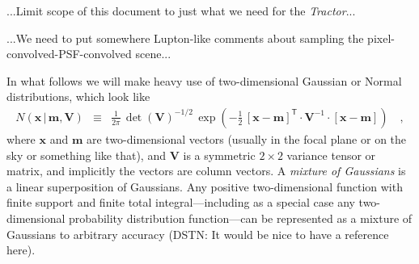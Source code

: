 \documentclass[12pt,pdftex,preprint]{aastex}
\newcommand{\project}[1]{\textsl{#1}}
\newcommand{\tractor}{\project{Tractor}}
\newcommand{\tmatrix}[1]{\boldsymbol{#1}}
\newcommand{\inverse}[1]{{#1}^{-1}}
\newcommand{\transpose}[1]{{#1}^{\mathsf T}}
\newcommand{\tvector}[1]{\boldsymbol{#1}}
\newcommand{\pos}{\tvector{x}}
\newcommand{\mean}{\tvector{m}}
\newcommand{\var}{\tmatrix{V}\!}
\newcommand{\normal}{N}
\newcommand{\given}{\,|\,}
\begin{document}
...Limit scope of this document to just what we need for the
\tractor...

...We need to put somewhere Lupton-like comments about sampling the
pixel-convolved-PSF-convolved scene...

In what follows we will make heavy use of two-dimensional Gaussian or
Normal distributions, which look like
\begin{eqnarray}\displaystyle
\normal(\pos\given\mean,\var) &\equiv& \frac{1}{2\pi}\,\det(\var)^{-1/2}\,\exp(-\frac{1}{2}\,\transpose{[\pos-\mean]}\cdot\inverse{\var}\cdot[\pos-\mean])
\quad ,
\end{eqnarray}
where $\pos$ and $\mean$ are two-dimensional vectors (usually in the
focal plane or on the sky or something like that), and $\var$ is a
symmetric $2\times 2$ variance tensor or matrix, and implicitly the
vectors are column vectors.  A \emph{mixture of Gaussians} is a linear
superposition of Gaussians.  Any positive two-dimensional function
with finite support and finite total integral---including as a special
case any two-dimensional probability distribution function---can be
represented as a mixture of Gaussians to arbitrary accuracy (DSTN: It
would be nice to have a reference here).
\end{document}
